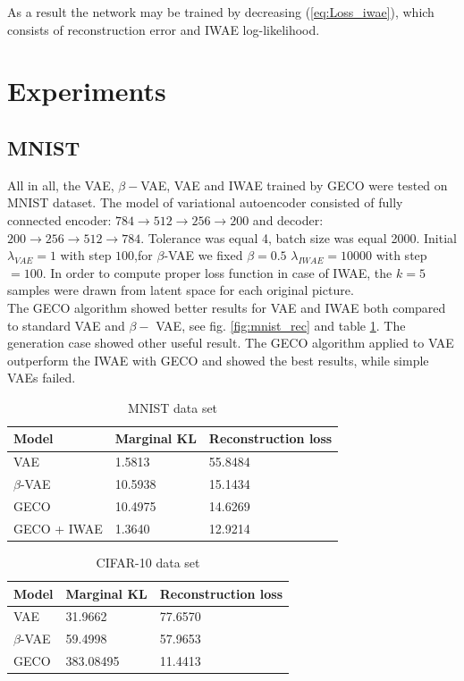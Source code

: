 \documentclass{article}
\begin{document}
As a result the network may be trained by decreasing (\ref{eq:Loss_iwae}), which consists of reconstruction error and IWAE log-likelihood. 





\section{Experiments}
\subsection{MNIST}
All in all, the VAE, $\beta-$VAE, VAE and IWAE trained by GECO were tested on MNIST dataset. The model of variational autoencoder consisted of fully connected encoder: $784\rightarrow 512 \rightarrow 256 \rightarrow 200$ and decoder: $200\rightarrow 256 \rightarrow 512 \rightarrow 784$.  Tolerance was equal 4, batch size was equal 2000. Initial $\lambda_{VAE} = 1$ with step  $100$,for  $\beta$-VAE  we fixed $\beta = 0.5$ $\lambda_{IWAE} = 10000$ with step $=100$. In order to compute proper loss function in case of IWAE, the $k=5$ samples were drawn from latent space for each original picture.\\

The GECO algorithm showed better results for VAE and IWAE both compared to standard VAE and $\beta-$ VAE, see fig. \ref{fig:mnist_rec} and table \ref{tab:mnist}. The generation case showed other useful result. The GECO algorithm applied to VAE outperform the IWAE with GECO and showed the best results, while simple VAEs failed.

\begin{table}[]
    \centering
    \begin{tabular}{|l|l|l|}
    \hline
         Model & Marginal KL & Reconstruction loss\\
    \hline
         VAE & 1.5813 & 55.8484\\
         $\beta$-VAE & 10.5938 & 15.1434\\
         GECO & 10.4975 & 14.6269\\
         GECO + IWAE & 1.3640 & 12.9214\\
    \hline
    \end{tabular}
    \caption{MNIST data set}
    \label{tab:mnist}
\end{table}


\begin{table}[]
    \centering
    \begin{tabular}{|l|l|l|}
    \hline
         Model & Marginal KL & Reconstruction loss\\
    \hline
         VAE & 31.9662 & 77.6570\\
         $\beta$-VAE & 59.4998 & 57.9653\\
         GECO & 383.08495 & 11.4413\\
    \hline
    \end{tabular}
    \caption{CIFAR-10 data set}
    \label{tab:cifar10}
\end{table}
\end{document}
